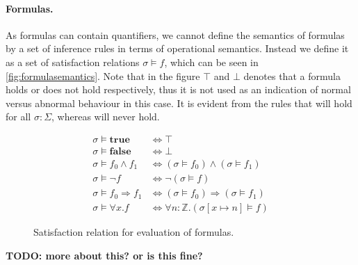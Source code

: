 \paragraph{Formulas.}
As formulas can contain quantifiers, we cannot define the semantics of formulas by a set
of inference rules in terms of operational semantics.
Instead we define it as a set of satisfaction relations $\sigma \vDash f$, which can be seen in \autoref{fig:formulasemantics}.
Note that in the figure $\top$ and $\bot$ denotes that a formula holds or does not hold
respectively, thus it is not used as an indication of normal versus abnormal behaviour
in this case.
It is evident from the rules that  will hold for all $\sigma: \Sigma$,
whereas  will never hold.

\begin{figure}[h!]
  \begin{align*}
    \sigma \vDash \mathbf{true} &\Longleftrightarrow \top \\
    \sigma \vDash \mathbf{false} &\Longleftrightarrow \bot \\
    \sigma \vDash f_{0} \land f_{1} &\Longleftrightarrow
           (\sigma \vDash f_{0}) \land (\sigma \vDash f_{1}) \\
    \sigma \vDash \neg f &\Longleftrightarrow \neg (\sigma \vDash f) \\
    \sigma \vDash f_{0} \Rightarrow f_{1} &\Longleftrightarrow
           (\sigma \vDash f_{0}) \Rightarrow (\sigma \vDash f_{1}) \\
    \sigma \vDash \forall x.f &\Longleftrightarrow
                                \forall n:\mathbb{Z}. (\sigma [x \mapsto n] \vDash f)
  \end{align*}
\caption{Satisfaction relation for evaluation of formulas.}
\label{fig:formulasemantics}
\end{figure}

\textbf{TODO: more about this? or is this fine?}
